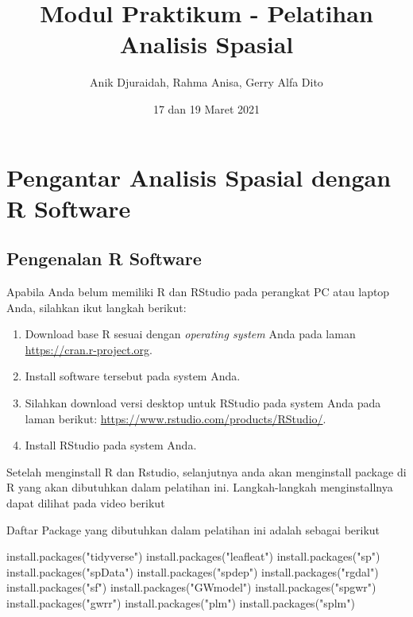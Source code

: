 \documentclass[
]{book}
\title{Modul Praktikum - Pelatihan Analisis Spasial}
\author{Anik Djuraidah, Rahma Anisa, Gerry Alfa Dito}
\date{17 dan 19 Maret 2021}
\newenvironment{Shaded}{\begin{snugshade}}{\end{snugshade}}
\newcommand{\FunctionTok}[1]{\textcolor[rgb]{0.00,0.00,0.00}{#1}}
\newcommand{\NormalTok}[1]{#1}
\newcommand{\StringTok}[1]{\textcolor[rgb]{0.31,0.60,0.02}{#1}}
\begin{document}
\maketitle

{
\setcounter{tocdepth}{1}
\tableofcontents
}
\hypertarget{pengantar-analisis-spasial-dengan-r-software}{%
\chapter{Pengantar Analisis Spasial dengan R Software}\label{pengantar-analisis-spasial-dengan-r-software}}

\hypertarget{pengenalan-r-software}{%
\section{Pengenalan R Software}\label{pengenalan-r-software}}

Apabila Anda belum memiliki R dan RStudio pada perangkat PC atau laptop Anda, silahkan ikut langkah berikut:

\begin{enumerate}
\def\labelenumi{\arabic{enumi}.}
\item
  Download base R sesuai dengan \emph{operating system} Anda pada laman \url{https://cran.r-project.org}.
\item
  Install software tersebut pada system Anda.
\item
  Silahkan download versi desktop untuk RStudio pada system Anda pada laman berikut: \url{https://www.rstudio.com/products/RStudio/}.
\item
  Install RStudio pada system Anda.
\end{enumerate}

Setelah menginstall R dan Rstudio, selanjutnya anda akan menginstall package di R yang akan dibutuhkan dalam pelatihan ini. Langkah-langkah menginstallnya dapat dilihat pada video berikut

Daftar Package yang dibutuhkan dalam pelatihan ini adalah sebagai berikut

\begin{Shaded}
\begin{Highlighting}[]
\FunctionTok{install.packages}\NormalTok{(}\StringTok{"tidyverse"}\NormalTok{)}
\FunctionTok{install.packages}\NormalTok{(}\StringTok{"leafleat"}\NormalTok{)}
\FunctionTok{install.packages}\NormalTok{(}\StringTok{"sp"}\NormalTok{)}
\FunctionTok{install.packages}\NormalTok{(}\StringTok{"spData"}\NormalTok{)}
\FunctionTok{install.packages}\NormalTok{(}\StringTok{"spdep"}\NormalTok{)}
\FunctionTok{install.packages}\NormalTok{(}\StringTok{"rgdal"}\NormalTok{)}
\FunctionTok{install.packages}\NormalTok{(}\StringTok{"sf"}\NormalTok{)}
\FunctionTok{install.packages}\NormalTok{(}\StringTok{"GWmodel"}\NormalTok{)}
\FunctionTok{install.packages}\NormalTok{(}\StringTok{"spgwr"}\NormalTok{)}
\FunctionTok{install.packages}\NormalTok{(}\StringTok{"gwrr"}\NormalTok{)}
\FunctionTok{install.packages}\NormalTok{(}\StringTok{"plm"}\NormalTok{)}
\FunctionTok{install.packages}\NormalTok{(}\StringTok{"splm"}\NormalTok{)}
\end{Highlighting}
\end{Shaded}
\end{document}
